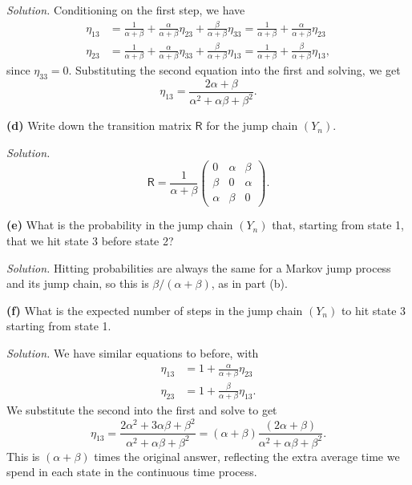 \documentclass[
  a4paper,
]{article}
\theoremstyle{definition}
\theoremstyle{definition}
\theoremstyle{definition}
\theoremstyle{remark}
\begin{document}
\begin{myanswers}
\emph{Solution.}
Conditioning on the first step, we have
\begin{align*}
\eta_{13} &= \frac{1}{\alpha + \beta} + \frac{\alpha}{\alpha + \beta} \eta_{23} + \frac{\beta}{\alpha + \beta} \eta_{33} = \frac{1}{\alpha + \beta} + \frac{\alpha}{\alpha + \beta} \eta_{23} \\
\eta_{23} &= \frac{1}{\alpha + \beta} + \frac{\alpha}{\alpha + \beta} \eta_{33} + \frac{\beta}{\alpha + \beta} \eta_{13} = \frac{1}{\alpha + \beta} + \frac{\beta}{\alpha + \beta} \eta_{13} ,
\end{align*}
since \(\eta_{33} = 0\). Substituting the second equation into the first and solving, we get
\[ \eta_{13} = \frac{2\alpha+\beta}{\alpha^2 + \alpha\beta + \beta^2} .  \]

\end{myanswers}

\textbf{(d)} Write down the transition matrix \(\mathsf R\) for the jump chain \((Y_n)\).

\begin{myanswers}
\emph{Solution.}
\[ \mathsf R = \frac{1}{\alpha+\beta} \begin{pmatrix} 0 & \alpha & \beta \\\beta & 0 & \alpha \\ \alpha & \beta & 0 \end{pmatrix} . \]

\end{myanswers}

\textbf{(e)} What is the probability in the jump chain \((Y_n)\) that, starting from state 1, that we hit state 3 before state 2?

\begin{myanswers}
\emph{Solution.}
Hitting probabilities are always the same for a Markov jump process and its jump chain, so this is \(\beta/(\alpha+\beta)\), as in part (b).

\end{myanswers}

\textbf{(f)} What is the expected number of steps in the jump chain \((Y_n)\) to hit state 3 starting from state 1.

\begin{myanswers}
\emph{Solution.}
We have similar equations to before, with
\begin{align*}
\eta_{13} &= 1 + \frac{\alpha}{\alpha + \beta} \eta_{23} \\
\eta_{23} &= 1 + \frac{\beta}{\alpha + \beta} \eta_{13} .
\end{align*}
We substitute the second into the first and solve to get
\[ \eta_{13} = \frac{2\alpha^2 + 3\alpha\beta + \beta^2}{\alpha^2 + \alpha\beta + \beta^2} = (\alpha + \beta) \frac{(2\alpha+\beta)}{\alpha^2 + \alpha\beta + \beta^2} .  \]
This is \((\alpha + \beta)\) times the original answer, reflecting the extra average time we spend in each state in the continuous time process.

\end{myanswers}
\end{document}
